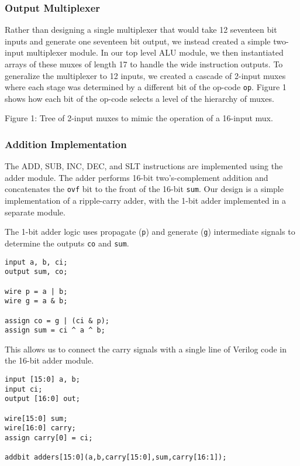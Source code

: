 \documentclass[11pt]{article}
\begin{document}
\subsubsection{Output Multiplexer}
Rather than designing a single multiplexer that would take 12 seventeen bit inputs and generate one seventeen bit output, we instead created a simple two-input multiplexer module. In our top level ALU module, we then instantiated arrays of these muxes of length 17 to handle the wide instruction outputs. To generalize the multiplexer to 12 inputs, we created a cascade of 2-input muxes where each stage was determined by a different bit of the op-code \texttt{op}. Figure 1 shows how each bit of the op-code selects a level of the hierarchy of muxes. \\


Figure 1: Tree of 2-input muxes to mimic the operation of a 16-input mux.

\subsubsection{Addition Implementation} 
The ADD, SUB, INC, DEC, and SLT instructions are implemented using the adder module. The adder performs 16-bit two's-complement addition and concatenates the \texttt{ovf} bit to the front of the 16-bit \texttt{sum}. Our design is a simple implementation of a ripple-carry adder, with the 1-bit adder implemented in a separate module. 

The 1-bit adder logic uses propagate (\texttt{p}) and generate (\texttt{g}) intermediate signals to determine the outputs \texttt{co} and \texttt{sum}.

\begin{lstlisting}
input a, b, ci;
output sum, co;

wire p = a | b;
wire g = a & b;

assign co = g | (ci & p);
assign sum = ci ^ a ^ b;
\end{lstlisting}

This allows us to connect the carry signals with a single line of Verilog code in the 16-bit adder module.

\begin{lstlisting}
input [15:0] a, b;
input ci;
output [16:0] out;

wire[15:0] sum;
wire[16:0] carry;
assign carry[0] = ci;

addbit adders[15:0](a,b,carry[15:0],sum,carry[16:1]);
\end{lstlisting}
\end{document}
